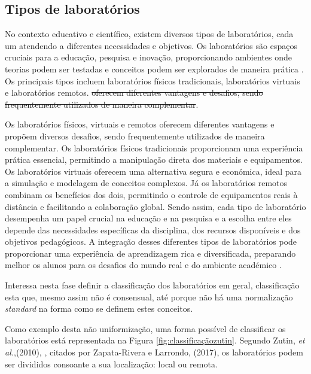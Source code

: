
\subsection{Tipos de laboratórios} %
\label{sec:tiposlaboratorios}
No contexto educativo e científico, existem diversos tipos de laboratórios, cada um atendendo a diferentes necessidades e objetivos. Os laboratórios são espaços cruciais para a educação, pesquisa e inovação, proporcionando ambientes onde teorias podem ser testadas e conceitos podem ser explorados de maneira prática \cite{Hofsteinfoundations}. Os principais tipos incluem laboratórios físicos tradicionais, laboratórios virtuais e laboratórios remotos. \sout {oferecem diferentes vantagens e desafios, sendo frequentemente utilizados de maneira complementar}. 

Os laboratórios físicos, virtuais e remotos oferecem diferentes vantagens e propõem diversos desafios, sendo frequentemente utilizados de maneira complementar. Os laboratórios físicos tradicionais proporcionam uma experiência prática essencial, permitindo a manipulação direta dos materiais e equipamentos. Os laboratórios virtuais oferecem uma alternativa segura e económica, ideal para a simulação e modelagem de conceitos complexos. Já os laboratórios remotos combinam os benefícios dos dois, permitindo o controle de equipamentos reais à distância e facilitando a colaboração global. Sendo assim, cada tipo de laboratório desempenha um papel crucial na educação e na pesquisa e a escolha entre eles depende das necessidades específicas da disciplina, dos recursos disponíveis e dos objetivos pedagógicos. A integração desses diferentes tipos de laboratórios pode proporcionar uma experiência de aprendizagem rica e diversificada, preparando melhor os alunos para os desafios do mundo real e do ambiente académico \cite{BRINSON2015218} \cite{ImpactRemoteLabTeachingPractices} \cite{Hofsteinfoundations}. 

Interessa nesta fase definir a classificação dos laboratórios em geral, classificação esta que, mesmo assim não é consensual, até porque não há uma normalização \textit{standard} na forma como se definem estes conceitos. 

Como exemplo desta não uniformização, uma forma possível de classificar os laboratórios está representada na Figura \ref{fig:classificaçãozutin}. Segundo Zutin, \textit{et al.},(2010), \cite{zutinlab2go}, citados por Zapata-Rivera e Larrondo, (2017), \cite{Zapata-Rivera} os laboratórios podem ser divididos consoante a sua localização: local ou remota. 

